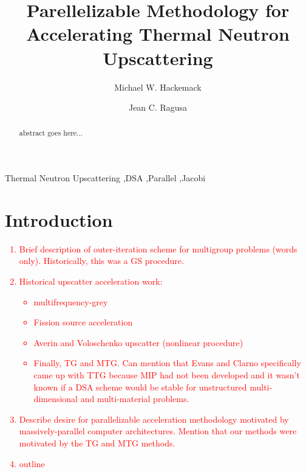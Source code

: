 \documentclass[preprint,10pt]{elsarticle}
\newcommand{\tcr}[1]{\textcolor{red}{#1}}
\begin{document}
\begin{frontmatter}
\title{Parellelizable Methodology for Accelerating Thermal Neutron Upscattering}
\author{Michael W. Hackemack}
\author{Jean C. Ragusa}
\address{Department of Nuclear Engineering, Texas A\&M University, College Station, TX 77843, USA}
\begin{abstract}
abstract goes here...
\end{abstract}
\begin{keyword}
Thermal Neutron Upscattering \sep DSA \sep Parallel \sep Jacobi
\end{keyword}
\end{frontmatter}

\linenumbers

\section{Introduction} \label{sec::intro}

\tcr
{
\begin{enumerate}
\item Brief description of outer-iteration scheme for multigroup problems (words only). Historically, this was a GS procedure.
\item Historical upscatter acceleration work:
\begin{itemize}
\item multifrequency-grey
\item Fission source acceleration
\item Averin and Voloschenko upscatter (nonlinear procedure)
\item Finally, TG and MTG. Can mention that Evans and Clarno specifically came up with TTG because MIP had not been developed and it wasn't known if a DSA scheme would be stable for unstructured multi-dimensional and multi-material problems.
\end{itemize}
\item Describe desire for parallelizable acceleration methodology motivated by massively-parallel computer architectures. Mention that our methods were motivated by the TG and MTG methods.
\item outline
\end{enumerate}
}
\end{document}
